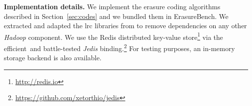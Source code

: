 \textbf{Implementation details.}
We implement the erasure coding algorithms described in Section~\ref{sec:codes} and we bundled them in ErasureBench. 
We extracted and adapted the \ac{lrc} libraries from \autocite{XorbasVLDB} to remove dependencies on any other \textit{Hadoop} component. 
We use the Redis distributed key-value store\footnote{\url{http://redis.io}} via the efficient and battle-tested \textit{Jedis}  binding.\footnote{\url{https://github.com/xetorthio/jedis}}
For testing purposes, an in-memory storage backend is also available.

